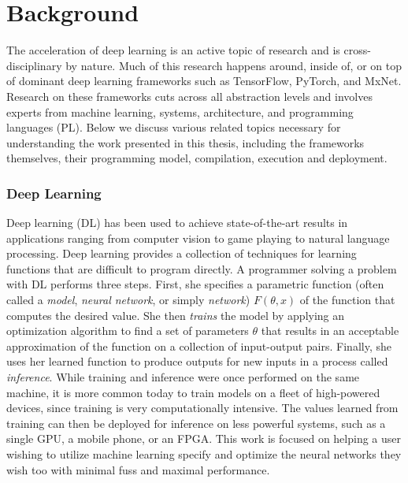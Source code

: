 \chapter{Background}
\label{ch:related}

The acceleration of deep learning is an active topic of research and is
  cross-disciplinary by nature.
Much of this research happens around, inside of, or on top of
  dominant deep learning frameworks such as TensorFlow, PyTorch, and MxNet.
Research on these frameworks cuts across all abstraction levels and
  involves experts from machine learning, systems, architecture, and programming languages (PL).
Below we discuss various related topics necessary for understanding the work presented
  in this thesis, including the frameworks themselves, their programming model, compilation, execution and deployment.

\subsection{Deep Learning}

Deep learning (DL) has been used to achieve state-of-the-art results in
  applications ranging from computer vision to game
  playing to natural language processing.
Deep learning provides a collection of techniques for learning functions that are difficult
  to program directly.
A programmer solving a problem with DL performs three steps.
First, she specifies a parametric function (often called a \textit{model},
  \textit{neural network}, or simply \textit{network}) $F(\theta, x)$ of the function
  that computes the desired value.
She then \textit{trains} the model by applying an optimization algorithm to find a set of
  parameters $\theta$ that results in an acceptable approximation of the function on a
  collection of input-output pairs.
Finally, she uses her learned function to produce outputs for new inputs in
  a process called \textit{inference}.
While training and inference were once performed on the same machine,
  it is more common today to train models on a fleet of high-powered devices,
  since training is very computationally intensive.
The values learned from training can then be deployed for inference on less powerful systems,
  such as a single GPU, a mobile phone, or an FPGA.
This work is focused on helping a user wishing to utilize machine learning specify and optimize
  the neural networks they wish too with minimal fuss and maximal performance.


